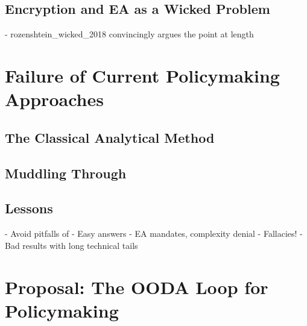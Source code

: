 
\subsection{Encryption and EA as a Wicked Problem}

- rozenshtein_wicked_2018 convincingly argues the point at length



\section{Failure of Current Policymaking Approaches}

\subsection{The Classical Analytical Method}

\subsection{Muddling Through}


\subsection{Lessons}

- Avoid pitfalls of
  - Easy answers
    - EA mandates, complexity denial
  - Fallacies!
  - Bad results with long technical tails


\section{Proposal: The OODA Loop for Policymaking}

